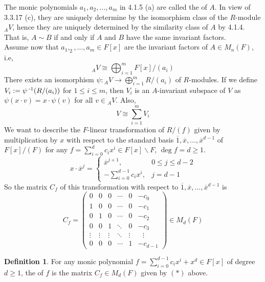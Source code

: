 \documentclass[11pt]{book}
\theoremstyle{definition}   \newtheorem{defn}[counter]{Definition} %
\newcommand{\ov}{\overline}   \newcommand{\wt}{\widetilde}
\newcommand{\bs}{\backslash}   \newcommand{\A}{\mathcal{A}}   \newcommand{\sy}{\textnormal{Syl}}   \newcommand{\size}[1]{\left| #1 \right|}
\newcommand{\mymatrix}[2]{\left( \begin{array}{#1} #2 \end{array} \right)}
\DeclareMathOperator{\ra}{\rightarrow}   \DeclareMathOperator{\Poly}{\mathbf{P}}   \DeclareMathOperator{\spn}{\textnormal{span}}   \DeclareMathOperator{\aut}{\textnormal{Aut}}
\newcommand{\vs}{\vspace{8pt}}
\numberwithin{counter}{chapter}
\begin{document}
\vs

\begin{remark}[+ Definition]
The monic polynomials $a_1,a_2,\dots,a_m$ in 4.1.5 (a) are called the  of $A$. In view of 3.3.17 (c), they are uniquely determine by the isomorphism class of the $R$-module $_AV$, hence they are uniquely determined by the similarity class of $A$ by 4.1.4. That is, $A \sim B$ if and only if $A$ and $B$ have the same invariant factors. \\

Assume now that $a_1,_2,\dots,a_m \in F[x]$ are the invariant factors of $A \in M_n(F)$, i.e,
	\[_AV \cong \bigoplus_{i=1}^m F[x]/(a_i) \]
There exists an isomorphism $\psi : {_AV} \ra \bigoplus_{i=1}^m R/(a_i)$ of $R$-modules. If we define $V_i := \psi\operatorname{^{-1}}(R/(a_i))$ for $1 \leq i \leq m$, then $V_i$ is an $A$-invariant subspace of $V$ as $\psi(x \cdot v) = x \cdot \psi(v)$ for all $v \in {_AV}$. Also,
	\[V \cong \sum_{i=1}^m V_i \]
We want to describe the $F$-linear transformation of $R/(f)$ given by multiplication by $x$ with respect to the standard basis $\ov{1},\ov{x},\dots,\ov{x}^{d-1}$ of $F[x]/(F)$ for any $f = \sum_{i=0}^d c_i x^i \in F[x]\bs F$, $\deg f = d \geq 1$.
	\[x \cdot \ov{x}^j = \begin{cases}
	\ov{x}^{j+1}, \quad & 0 \leq j \leq d-2 \\
	-\sum_{i=0}^{d-1} c_i x^i, & j = d-1
	\end{cases} \]
So the matrix $C_f$ of this transformation with respect to $\ov{1},\ov{x},\dots,\ov{x}^{d-1}$ is
	\[C_f = \mymatrix{cccccl}{0 & 0 & 0 & \cdots & 0 & -c_0 \\
							  1 & 0 & 0 & \cdots & 0 & -c_1 \\
							  0 & 1 & 0 & \cdots & 0 & -c_2 \\
							  0 & 0 & 1 & \ddots & 0 & -c_3 \\
							  \vdots & \vdots & \vdots & \ddots & \vdots & \ \ \ \vdots \\
							  0 & 0 & 0 & \cdots & 1 & -c_{d-1}} \in M_d(F) \tag{$\ast$}\]
\end{remark}

\vs

\begin{defn}
For any monic polynomial $f = \sum_{i=0}^{d-1} c_i x^i + x^d \in F[x]$ of degree $d \geq 1$, the  of $f$ is the matrix $C_f \in M_d(F)$ given by $(\ast)$ above.
\end{defn}

\vs
\end{document}
